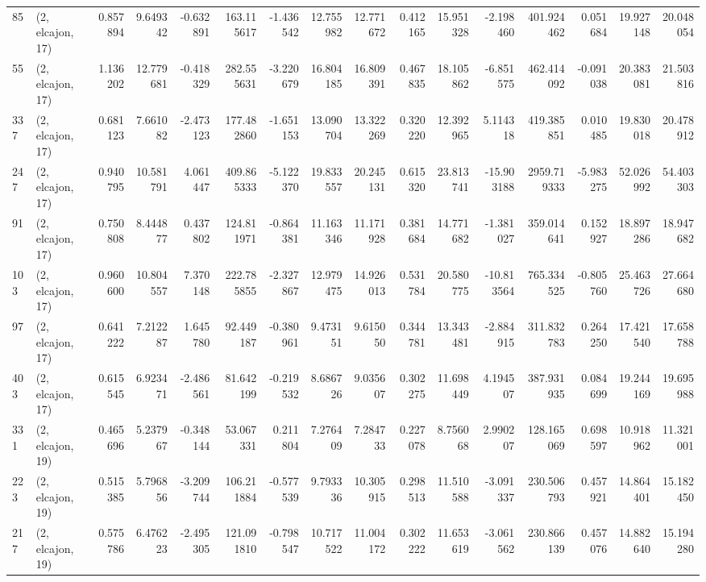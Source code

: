 \begin{tabular}{llrrrrrrrrrrrrrr}
85  &  (2, elcajon, 17) &   0.857894 &   9.649342 &  -0.632891 &   163.115617 &  -1.436542 &  12.755982 &  12.771672 &  0.412165 &  15.951328 &  -2.198460 &   401.924462 &   0.051684 &  19.927148 &  20.048054 \\
55  &  (2, elcajon, 17) &   1.136202 &  12.779681 &  -0.418329 &   282.555631 &  -3.220679 &  16.804185 &  16.809391 &  0.467835 &  18.105862 &  -6.851575 &   462.414092 &  -0.091038 &  20.383081 &  21.503816 \\
337 &  (2, elcajon, 17) &   0.681123 &   7.661082 &  -2.473123 &   177.482860 &  -1.651153 &  13.090704 &  13.322269 &  0.320220 &  12.392965 &   5.114318 &   419.385851 &   0.010485 &  19.830018 &  20.478912 \\
247 &  (2, elcajon, 17) &   0.940795 &  10.581791 &   4.061447 &   409.865333 &  -5.122370 &  19.833557 &  20.245131 &  0.615320 &  23.813741 & -15.903188 &  2959.719333 &  -5.983275 &  52.026992 &  54.403303 \\
91  &  (2, elcajon, 17) &   0.750808 &   8.444877 &   0.437802 &   124.811971 &  -0.864381 &  11.163346 &  11.171928 &  0.381684 &  14.771682 &  -1.381027 &   359.014641 &   0.152927 &  18.897286 &  18.947682 \\
103 &  (2, elcajon, 17) &   0.960600 &  10.804557 &   7.370148 &   222.785855 &  -2.327867 &  12.979475 &  14.926013 &  0.531784 &  20.580775 & -10.813564 &   765.334525 &  -0.805760 &  25.463726 &  27.664680 \\
97  &  (2, elcajon, 17) &   0.641222 &   7.212287 &   1.645780 &    92.449187 &  -0.380961 &   9.473151 &   9.615050 &  0.344781 &  13.343481 &  -2.884915 &   311.832783 &   0.264250 &  17.421540 &  17.658788 \\
403 &  (2, elcajon, 17) &   0.615545 &   6.923471 &  -2.486561 &    81.642199 &  -0.219532 &   8.686726 &   9.035607 &  0.302275 &  11.698449 &   4.194507 &   387.931935 &   0.084699 &  19.244169 &  19.695988 \\
331 &  (2, elcajon, 19) &   0.465696 &   5.237967 &  -0.348144 &    53.067331 &   0.211804 &   7.276409 &   7.284733 &  0.227078 &   8.756068 &   2.990207 &   128.165069 &   0.698597 &  10.918962 &  11.321001 \\
223 &  (2, elcajon, 19) &   0.515385 &   5.796856 &  -3.209744 &   106.211884 &  -0.577539 &   9.793336 &  10.305915 &  0.298513 &  11.510588 &  -3.091337 &   230.506793 &   0.457921 &  14.864401 &  15.182450 \\
217 &  (2, elcajon, 19) &   0.575786 &   6.476223 &  -2.495305 &   121.091810 &  -0.798547 &  10.717522 &  11.004172 &  0.302222 &  11.653619 &  -3.061562 &   230.866139 &   0.457076 &  14.882640 &  15.194280 \\

\end{tabular}
